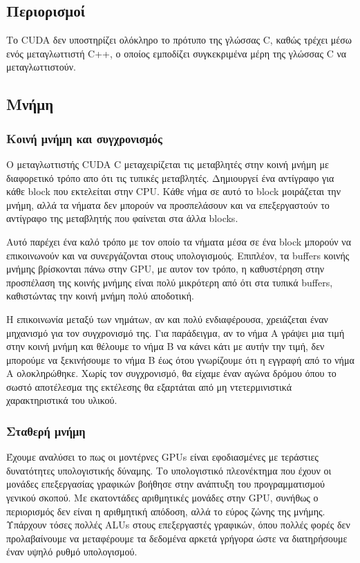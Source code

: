 \subsection{Περιορισμοί}
 Το CUDA δεν υποστηρίζει ολόκληρο το πρότυπο της γλώσσας C, καθώς τρέχει μέσω ενός μεταγλωττιστή C++, ο οποίος εμποδίζει συγκεκριμένα μέρη της γλώσσας C να μεταγλωττιστούν.

\subsection{Μνήμη}
\subsubsection{Κοινή μνήμη και συγχρονισμός}
Ο μεταγλωττιστής CUDA C μεταχειρίζεται τις μεταβλητές στην κοινή μνήμη με διαφορετικό τρόπο απο ότι τις τυπικές μεταβλητές. Δημιουργεί ένα αντίγραφο για κάθε block που εκτελείται στην CPU. Κάθε νήμα σε αυτό το block μοιράζεται την μνήμη, αλλά τα νήματα δεν μπορούν να προσπελάσουν και να επεξεργαστούν το αντίγραφο της μεταβλητής που φαίνεται στα άλλα blocks.

Αυτό παρέχει ένα καλό τρόπο με τον οποίο τα νήματα μέσα σε ένα block μπορούν να επικοινωνούν και να συνεργάζονται στους υπολογισμούς. Επιπλέον, τα buffers κοινής μνήμης βρίσκονται πάνω στην GPU, με αυτον τον τρόπο, η καθυστέρηση στην προσπέλαση της κοινής μνήμης είναι πολύ μικρότερη από ότι στα τυπικά buffers, καθιστώντας την κοινή μνήμη πολύ αποδοτική.\cite{cuda-3}

Η επικοινωνία μεταξύ των νημάτων, αν και πολύ ενδιαφέρουσα, χρειάζεται έναν μηχανισμό για τον συγχρονισμό της. Για παράδειγμα, αν το νήμα Α γράψει μια τιμή στην κοινή μνήμη και θέλουμε το νήμα Β να κάνει κάτι με αυτήν την τιμή, δεν μπορούμε να ξεκινήσουμε το νήμα Β έως ότου γνωρίζουμε ότι η εγγραφή από το νήμα Α ολοκληρώθηκε. Χωρίς τον συγχρονισμό, θα είχαμε έναν αγώνα δρόμου όπου το σωστό αποτέλεσμα της εκτέλεσης θα εξαρτάται από μη ντετερμινιστικά χαρακτηριστικά του υλικού.
\subsubsection{Σταθερή μνήμη}
Έχουμε αναλύσει το πως οι μοντέρνες GPUs είναι εφοδιασμένες με τεράστιες δυνατότητες υπολογιστικής δύναμης. Το υπολογιστικό πλεονέκτημα που έχουν οι μονάδες επεξεργασίας γραφικών βοήθησε στην ανάπτυξη του προγραμματισμού γενικού σκοπού. Με εκατοντάδες αριθμητικές μονάδες στην GPU, συνήθως ο περιορισμός δεν είναι η αριθμητική απόδοση, αλλά το εύρος ζώνης της μνήμης. Υπάρχουν τόσες πολλές ALUs στους επεξεργαστές γραφικών, όπου πολλές φορές δεν προλαβαίνουμε να μεταφέρουμε τα δεδομένα αρκετά γρήγορα ώστε να διατηρήσουμε έναν υψηλό ρυθμό υπολογισμού. 

